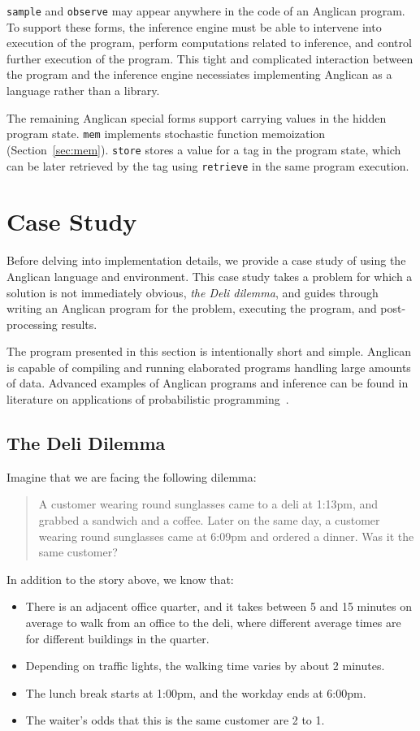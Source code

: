 \documentclass[preprint]{sigplanconf}
\begin{document}
\texttt{sample} and \texttt{observe} may appear anywhere in the
code of an Anglican program. To support these forms, the
inference engine must be able to intervene into execution of the
program, perform computations related to inference, and control
further execution of the program. This tight and complicated
interaction between the program and the inference engine
necessiates implementing Anglican as a language rather than a
library.

The remaining Anglican special forms support carrying values in
the hidden program state. \texttt{mem} implements stochastic
function  memoization (Section~\ref{sec:mem}). \texttt{store}
stores a value for a tag in the program state, which can be
later retrieved by the tag using \texttt{retrieve} in the same
program execution.

\section{Case Study}
\label{seq:study}

Before delving into implementation details, we provide a case
study of using the Anglican language and environment. This case
study takes a problem for which a solution is not immediately
obvious, \textit{the Deli dilemma}, and guides through writing
an Anglican program for the problem, executing the program, and
post-processing results. 

The program presented in this section is intentionally short and
simple. Anglican is capable of compiling and running elaborated
programs handling large amounts of data. Advanced examples of
Anglican programs and inference can be found in literature on
applications of probabilistic programming~\cite{PLW15, P16, MPT+16}.

\subsection{The Deli Dilemma}
\label{seq:deli}

Imagine that we are facing the following dilemma:
\begin{quote}
A customer wearing round sunglasses came to a deli at 1:13pm,
and grabbed a sandwich and a coffee. Later on the same day, a
customer wearing round sunglasses came at 6:09pm and ordered a
dinner.  Was it the same customer?
\end{quote}
In addition to the story above, we know that:
\begin{itemize}
    \item There is an adjacent office quarter, and it takes
        between 5 and 15 minutes on average to walk from an
        office to the deli, where different average times are  for
        different buildings in the quarter.
    \item Depending on traffic lights, the walking time varies by about 2
        minutes.
    \item The lunch break starts at 1:00pm, and the workday ends at 6:00pm.
    \item The waiter's odds that this is the same customer are 2 to 1.
\end{itemize}
\end{document}

